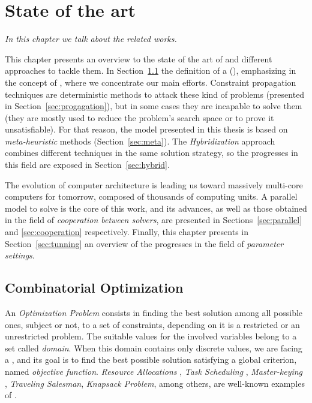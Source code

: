 \chapter{State of the art}
\label{chap:Art}
\textit{In this chapter we talk about the related works.}
\vfill
\minitoc
\newpage


This chapter presents an overview to the state of the art of \COPs{} and different approaches to tackle them. In Section~\ref{sec:combi} the definition of a \CSP{} (\csp), emphasizing in the concept of \CSPs, where we concentrate our main efforts. Constraint propagation techniques are deterministic methods to attack these kind of problems (presented in Section~\ref{sec:progagation}), but in some cases they are incapable to solve them (they are mostly used to reduce the problem's search space or to prove it unsatisfiable). For that reason, the model presented in this thesis is based on \textit{meta-heuristic} methods (Section~\ref{sec:meta}). The \textit{Hybridization} approach combines different techniques in the same solution strategy, so the progresses in this field are exposed in Section~\ref{sec:hybrid}.

The evolution of computer architecture is leading us toward massively multi-core computers for tomorrow, composed of thousands of computing units. A parallel model to solve \csps{} is the core of this work, and its advances, as well as those obtained in the field of \textit{cooperation between solvers}, are presented in Sections~\ref{sec:parallel} and \ref{sec:cooperation} respectively. Finally, this chapter presents in Section~\ref{sec:tunning} an overview of the progresses in the field of \textit{parameter settings}.  

\section{Combinatorial Optimization}
\label{sec:combi}

An \textit{Optimization Problem} consists in finding the best solution among all possible ones, subject or not, to a set of constraints, depending on it is a restricted or an unrestricted problem. The suitable values for the involved variables belong to a set called {\it domain}. When this domain contains only discrete values, we are facing a \COP, and its goal is to find the best possible solution satisfying a global criterion, named {\it objective function}. {\it Resource Allocations} \cite{Akplogan2011}, \textit{Task Scheduling} \cite{Sibbesen2008}, \textit{Master-keying} \cite{Espelage2000}, \textit{Traveling Salesman}, \textit{Knapsack Problem}, among others, are well-known examples of \COPs{} \cite{Smith2005}.

